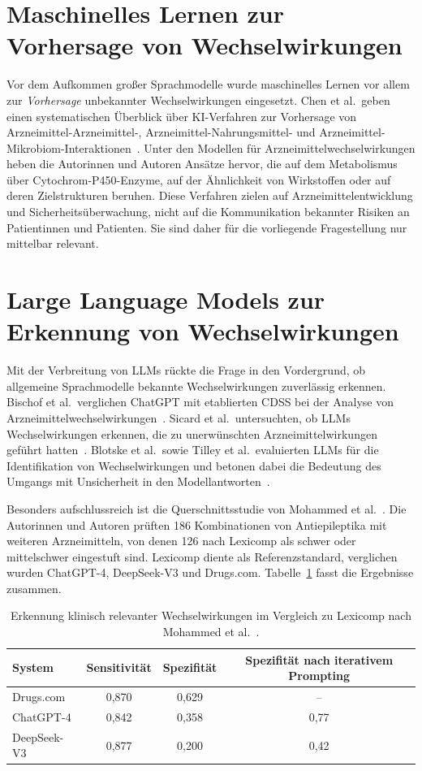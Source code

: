 \section{Maschinelles Lernen zur Vorhersage von Wechselwirkungen}

Vor dem Aufkommen großer Sprachmodelle wurde maschinelles Lernen vor allem zur \emph{Vorhersage} unbekannter Wechselwirkungen eingesetzt. Chen et al.\ geben einen systematischen Überblick über KI-Verfahren zur Vorhersage von Arzneimittel-Arzneimittel-, Arzneimittel-Nahrungsmittel- und Arzneimittel-Mikrobiom-Interaktionen~\cite{10.1093/bib/bbac427}. Unter den Modellen für Arzneimittelwechselwirkungen heben die Autorinnen und Autoren Ansätze hervor, die auf dem Metabolismus über Cytochrom-P450-Enzyme, auf der Ähnlichkeit von Wirkstoffen oder auf deren Zielstrukturen beruhen. Diese Verfahren zielen auf Arzneimittelentwicklung und Sicherheitsüberwachung, nicht auf die Kommunikation bekannter Risiken an Patientinnen und Patienten. Sie sind daher für die vorliegende Fragestellung nur mittelbar relevant.

\section{Large Language Models zur Erkennung von Wechselwirkungen}

Mit der Verbreitung von LLMs rückte die Frage in den Vordergrund, ob allgemeine Sprachmodelle bekannte Wechselwirkungen zuverlässig erkennen. Bischof et al.\ verglichen ChatGPT mit etablierten CDSS bei der Analyse von Arzneimittelwechselwirkungen~\cite{Bischof2025}. Sicard et al.\ untersuchten, ob LLMs Wechselwirkungen erkennen, die zu unerwünschten Arzneimittelwirkungen geführt hatten~\cite{Sicard2025}. Blotske et al.\ sowie Tilley et al.\ evaluierten LLMs für die Identifikation von Wechselwirkungen und betonen dabei die Bedeutung des Umgangs mit Unsicherheit in den Modellantworten~\cite{Blotske2025, Tilley2026}.

Besonders aufschlussreich ist die Querschnittsstudie von Mohammed et al.~\cite{MOHAMMED2026100733}. Die Autorinnen und Autoren prüften 186 Kombinationen von Antiepileptika mit weiteren Arzneimitteln, von denen 126 nach Lexicomp als schwer oder mittelschwer eingestuft sind. Lexicomp diente als Referenzstandard, verglichen wurden ChatGPT-4, DeepSeek-V3 und Drugs.com. Tabelle~\ref{tab:mohammed} fasst die Ergebnisse zusammen.

\begin{table}[htbp]
  \centering
  \small
  \caption{Erkennung klinisch relevanter Wechselwirkungen im Vergleich zu Lexicomp nach Mohammed et al.~\cite{MOHAMMED2026100733}.}
  \label{tab:mohammed}
  \begin{tabular}{@{}lccc@{}}
    \toprule
    System & Sensitivität & Spezifität & Spezifität nach iterativem Prompting \\
    \midrule
    Drugs.com   & 0{,}870 & 0{,}629 & -- \\
    ChatGPT-4   & 0{,}842 & 0{,}358 & 0{,}77 \\
    DeepSeek-V3 & 0{,}877 & 0{,}200 & 0{,}42 \\
    \bottomrule
  \end{tabular}
\end{table}

